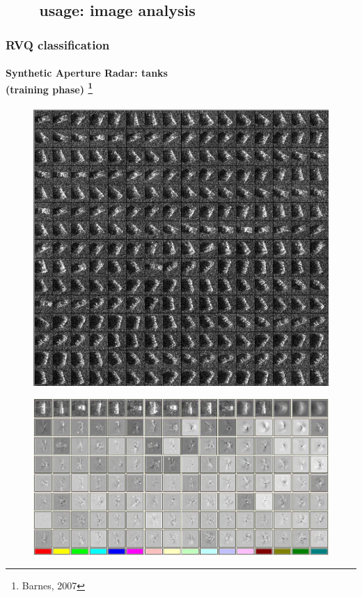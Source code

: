 

\subsection{\ \ \ \ usage: image analysis}
\begin{frame}
\frametitle{RVQ classification}
\framesubtitle{\small Synthetic Aperture Radar: tanks\\(training phase) \tiny{\footnote{Barnes, 2007}}}
\logoCSIPCPL\mypagenum
	\begin{figure}		
		\includegraphics[height=0.35\textheight]{figs/RVQ_SARtank_1_snippets.png}			
	\end{figure}
	\begin{figure}
		\includegraphics[height=0.35\textheight]{figs/RVQ_SARtank_2_codebooks.png}

\end{figure}
\end{frame}
